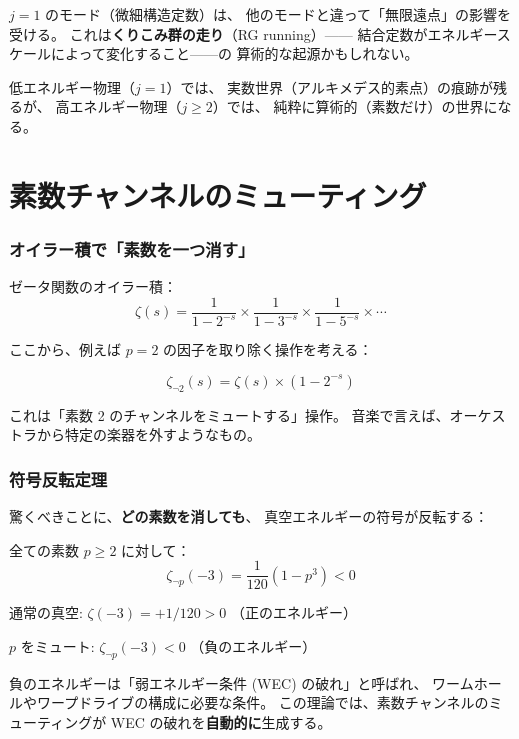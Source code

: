 \documentclass[11pt,a4paper]{article}
\begin{document}
\begin{deepbox}[物理的解釈]
$j = 1$ のモード（微細構造定数）は、
他のモードと違って「無限遠点」の影響を受ける。
これは\textbf{くりこみ群の走り}（RG running）——
結合定数がエネルギースケールによって変化すること——の
算術的な起源かもしれない。

低エネルギー物理（$j = 1$）では、
実数世界（アルキメデス的素点）の痕跡が残るが、
高エネルギー物理（$j \geq 2$）では、
純粋に算術的（素数だけ）の世界になる。
\end{deepbox}

\part{素数チャンネルのミューティング}

\section{オイラー積で「素数を一つ消す」}

ゼータ関数のオイラー積：
$$\zeta(s) = \frac{1}{1-2^{-s}} \times \frac{1}{1-3^{-s}} \times \frac{1}{1-5^{-s}} \times \cdots$$

ここから、例えば $p = 2$ の因子を取り除く操作を考える：

$$\zeta_{\neg 2}(s) = \zeta(s) \times (1 - 2^{-s})$$

これは「素数 2 のチャンネルをミュートする」操作。
音楽で言えば、オーケストラから特定の楽器を外すようなもの。

\section{符号反転定理}

驚くべきことに、\textbf{どの素数を消しても}、
真空エネルギーの符号が反転する：

\begin{resultbox}[符号反転定理]
全ての素数 $p \geq 2$ に対して：
$$\zeta_{\neg p}(-3) = \frac{1}{120}(1 - p^3) < 0$$

通常の真空: $\zeta(-3) = +1/120 > 0$ （正のエネルギー）

$p$ をミュート: $\zeta_{\neg p}(-3) < 0$ （負のエネルギー）
\end{resultbox}

負のエネルギーは「弱エネルギー条件 (WEC) の破れ」と呼ばれ、
ワームホールやワープドライブの構成に必要な条件。
この理論では、素数チャンネルのミューティングが
WEC の破れを\textbf{自動的に}生成する。
\end{document}
